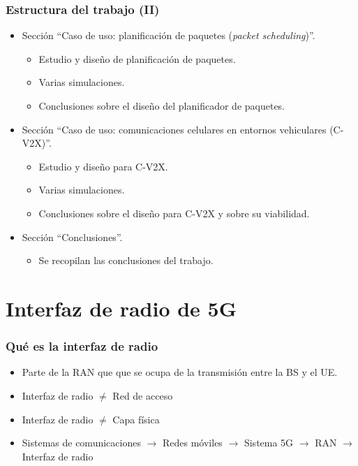 \documentclass{beamer}
\begin{document}
\begin{frame}
\frametitle{Estructura del trabajo (II)}

\begin{itemize}
\item {
	Sección ``Caso de uso: planificación de paquetes (\textit{packet scheduling})''.
	\begin{itemize}
	\item Estudio y diseño de planificación de paquetes.
	\item Varias simulaciones.
	\item Conclusiones sobre el diseño del planificador de paquetes.
	\end{itemize}
}
\item {
	Sección ``Caso de uso: comunicaciones celulares en entornos vehiculares (C-V2X)''.
	\begin{itemize}
	\item Estudio y diseño para C-V2X.
	\item Varias simulaciones.
	\item Conclusiones sobre el diseño para C-V2X y sobre su viabilidad.
	\end{itemize}
}
\item {
	Sección ``Conclusiones''.
	\begin{itemize}
	\item Se recopilan las conclusiones del trabajo.
	\end{itemize}
}
\end{itemize}
\end{frame}





\section{Interfaz de radio de 5G}

\begin{frame}
\frametitle{Qué es la interfaz de radio}

\begin{itemize}
\item Parte de la RAN que que se ocupa de la transmisión entre la BS y el UE.
\item Interfaz de radio $\neq$ Red de acceso
\item Interfaz de radio $\neq$ Capa física
\item Sistemas de comunicaciones $\rightarrow$ Redes móviles $\rightarrow$ Sistema 5G $\rightarrow$ RAN $\rightarrow$ Interfaz de radio
\end{itemize}
\end{frame}
\end{document}
